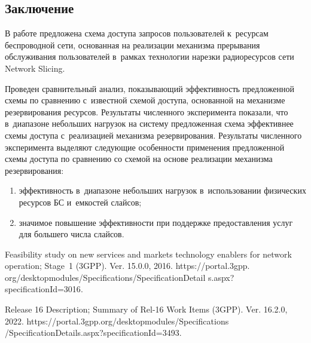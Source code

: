 \begin{multicols}{2}



\section{Заключение}

В работе предложена схема доступа запросов пользователей к~ресурсам беспроводной 
сети, основанная на реализации механизма прерывания обслуживания пользователей в~рамках технологии нарезки радиоресурсов сети Network Slicing. 

Проведен 
сравнительный анализ, по\-ка\-зы\-ва\-ющий эффективность предложенной схемы по сравнению с~известной схемой доступа, основанной на механизме резервирования ресурсов.  
Результаты численного эксперимента показали, что в~диапазоне небольших нагрузок 
на сис\-те\-му предложенная схема эффективнее схемы доступа с~реализацией механизма 
резервирования.
Результаты численного эксперимента выделяют сле\-ду\-ющие особенности применения 
предложенной схемы до\-сту\-па по сравнению со схемой на основе реализации механизма 
резервирования:
\begin{enumerate}[(1)]
\item 
эффективность в~диапазоне небольших нагрузок в~использовании физических 
ресурсов БС и~емкостей слайсов;
\item 
значимое повышение эффективности при поддержке предоставления услуг для 
большего числа слайсов.
\end{enumerate}


{\small\frenchspacing
 {%
 \begin{thebibliography}{99}


 Feasibility study on new 
services and markets technology enablers for network operation; Stage~1 (3GPP). 
Ver. 15.0.0, 2016. 
{\sf https://portal.3gpp. org/desktopmodules/Specifications/SpecificationDetail s.aspx?specificationId=3016}.

 Release 16 
Description; Summary of Rel-16 Work Items (3GPP). Ver. 16.2.0, 2022. 
{\sf https://portal.3gpp.org/desktopmodules/Specifications /SpecificationDetails.aspx?specificationId=3493}.


\end{thebibliography}}}
\end{multicols}

